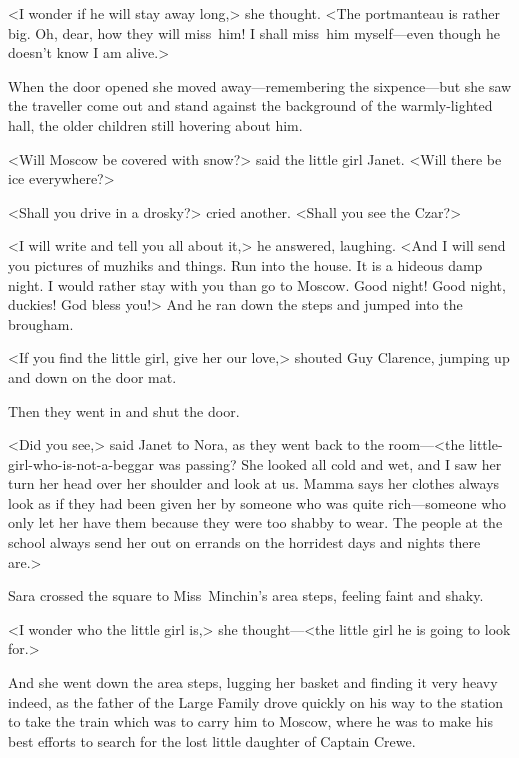 <I wonder if he will stay away long,> she thought. <The portmanteau is rather big. Oh, dear, how they will miss~him! I shall miss~him myself—even though he doesn't know I am alive.>

When the door opened she moved away—remembering the sixpence—but she saw the traveller come out and stand against the background of the warmly-lighted hall, the older children still hovering about him.

<Will Moscow be covered with snow?> said the little girl Janet. <Will there be ice everywhere?>

<Shall you drive in a drosky?> cried another. <Shall you see the Czar?>

<I will write and tell you all about it,> he answered, laughing. <And I will send you pictures of muzhiks and things. Run into the house. It is a hideous damp night. I would rather stay with you than go to Moscow. Good night! Good night, duckies! God bless you!> And he ran down the steps and jumped into the brougham.

<If you find the little girl, give her our love,> shouted Guy Clarence, jumping up and down on the door mat.

Then they went in and shut the door.

<Did you see,> said Janet to Nora, as they went back to the room—<the little-girl-who-is-not-a-beggar was passing? She looked all cold and wet, and I saw her turn her head over her shoulder and look at us. Mamma says her clothes always look as if they had been given her by someone who was quite rich—someone who only let her have them because they were too shabby to wear. The people at the school always send her out on errands on the horridest days and nights there are.>

Sara crossed the square to Miss~Minchin's area steps, feeling faint and shaky.

<I wonder who the little girl is,> she thought—<the little girl he is going to look for.>

And she went down the area steps, lugging her basket and finding it very heavy indeed, as the father of the Large Family drove quickly on his way to the station to take the train which was to carry him to Moscow, where he was to make his best efforts to search for the lost little daughter of Captain Crewe.